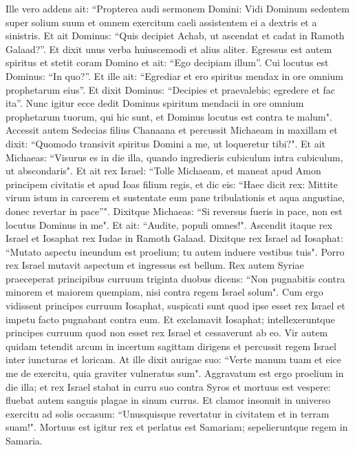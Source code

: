 \begin{biblechapter}
\verse Ille vero addens ait: “Propterea audi sermonem Domini: Vidi Dominum sedentem super solium suum et omnem exercitum caeli assistentem ei a dextris et a sinistris. 
\verse Et ait Dominus: “Quis decipiet Achab, ut ascendat et cadat in Ramoth Galaad?”. Et dixit unus verba huiuscemodi et alius aliter. 
\verse Egressus est autem spiritus et stetit coram Domino et ait: “Ego decipiam illum”. Cui locutus est Dominus: “In quo?”. 
\verse Et ille ait: “Egrediar et ero spiritus mendax in ore omnium prophetarum eius”. Et dixit Dominus: “Decipies et praevalebis; egredere et fac ita”. 
\verse Nunc igitur ecce dedit Dominus spiritum mendacii in ore omnium prophetarum tuorum, qui hic sunt, et Dominus locutus est contra te malum". 
\verse Accessit autem Sedecias filius Chanaana et percussit Michaeam in maxillam et dixit: “Quomodo transivit spiritus Domini a me, ut loqueretur tibi?". 
\verse Et ait Michaeas: “Visurus es in die illa, quando ingredieris cubiculum intra cubiculum, ut abscondaris". 
\verse Et ait rex Israel: “Tolle Michaeam, et maneat apud Amon principem civitatis et apud Ioas filium regis, 
\verse et dic eis: “Haec dicit rex: Mittite virum istum in carcerem et sustentate eum pane tribulationis et aqua angustiae, donec revertar in pace”". 
\verse Dixitque Michaeas: “Si reversus fueris in pace, non est locutus Dominus in me". Et ait: “Audite, populi omnes!". 
\verse Ascendit itaque rex Israel et Iosaphat rex Iudae in Ramoth Galaad. 
\verse Dixitque rex Israel ad Iosaphat: “Mutato aspectu ineundum est proelium; tu autem induere vestibus tuis". Porro rex Israel mutavit aspectum et ingressus est bellum. 
\verse Rex autem Syriae praeceperat principibus curruum triginta duobus dicens: “Non pugnabitis contra minorem et maiorem quempiam, nisi contra regem Israel solum". 
\verse Cum ergo vidissent principes curruum Iosaphat, suspicati sunt quod ipse esset rex Israel et impetu facto pugnabant contra eum. Et exclamavit Iosaphat; 
\verse intellexeruntque principes curruum quod non esset rex Israel et cessaverunt ab eo. 
\verse Vir autem quidam tetendit arcum in incertum sagittam dirigens et percussit regem Israel inter iuncturas et loricam. At ille dixit aurigae suo: “Verte manum tuam et eice me de exercitu, quia graviter vulneratus sum". 
\verse Aggravatum est ergo proelium in die illa; et rex Israel stabat in curru suo contra Syros et mortuus est vespere: fluebat autem sanguis plagae in sinum currus. 
\verse Et clamor insonuit in universo exercitu ad solis occasum: “Unusquisque revertatur in civitatem et in terram suam!". 
\verse Mortuus est igitur rex et perlatus est Samariam; sepelieruntque regem in Samaria. 

\end{biblechapter}
